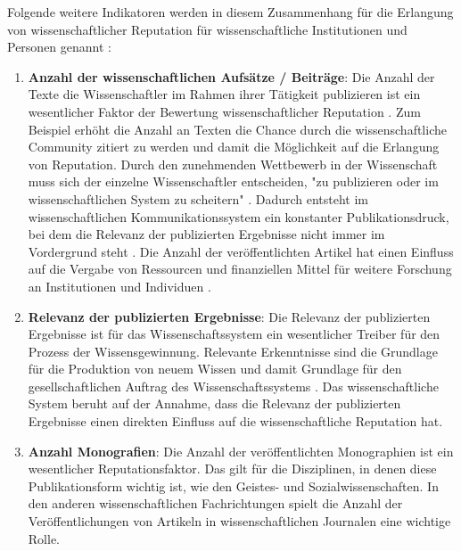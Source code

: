 Folgende weitere Indikatoren werden in diesem Zusammenhang für die Erlangung von wissenschaftlicher Reputation für wissenschaftliche Institutionen und Personen genannt \cite{hanekop_2008}:
\begin{enumerate}
\item \textbf{Anzahl der wissenschaftlichen Aufsätze / Beiträge}: Die Anzahl der Texte die Wissenschaftler im Rahmen ihrer Tätigkeit publizieren ist ein wesentlicher Faktor der Bewertung wissenschaftlicher Reputation \cite{luhmann_1970_selbststeuerung} \cite{CLAPHAM_2005}. Zum Beispiel erhöht die Anzahl an Texten die Chance durch die wissenschaftliche Community zitiert zu werden und damit die Möglichkeit auf die Erlangung von Reputation. Durch den zunehmenden Wettbewerb in der Wissenschaft muss sich der einzelne Wissenschaftler entscheiden, "zu publizieren oder im wissenschaftlichen System zu scheitern" \cite{Suess_2006}. Dadurch entsteht im wissenschaftlichen Kommunikationssystem ein konstanter Publikationsdruck, bei dem die Relevanz der publizierten Ergebnisse nicht immer im Vordergrund steht \cite{hamilton_1990_publishing}. Die Anzahl der veröffentlichten Artikel hat einen Einfluss auf die Vergabe von Ressourcen und finanziellen Mittel für weitere Forschung an Institutionen und Individuen \cite{hamilton_1990_publishing}.
\item \textbf{Relevanz der publizierten Ergebnisse}: Die Relevanz der publizierten Ergebnisse ist für das Wissenschaftssystem ein wesentlicher Treiber für den Prozess der Wissensgewinnung. Relevante Erkenntnisse sind die Grundlage für die Produktion von neuem Wissen und damit Grundlage für den gesellschaftlichen Auftrag des Wissenschaftssystems \cite{suchen}. Das wissenschaftliche System beruht auf der Annahme, dass die Relevanz der publizierten Ergebnisse einen direkten Einfluss auf die wissenschaftliche Reputation hat.
\item \textbf{Anzahl Monografien}: Die Anzahl der veröffentlichten Monographien ist ein wesentlicher Reputationsfaktor. Das gilt für die Disziplinen, in denen diese Publikationsform wichtig ist, wie den Geistes- und Sozialwissenschaften. In den anderen wissenschaftlichen Fachrichtungen spielt die Anzahl der Veröffentlichungen von Artikeln in wissenschaftlichen Journalen eine wichtige Rolle.

\end{enumerate}
